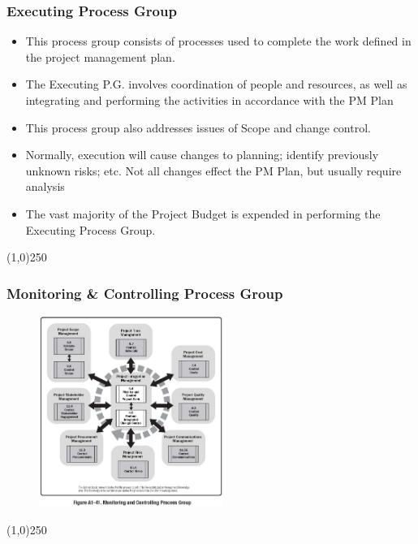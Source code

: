 \begin{frame}
\frametitle{Executing Process Group}
\begin{itemize}
	\item This process group consists of processes used to complete the work defined in the project management plan.
	\item The Executing P.G. involves coordination of people and resources, as well as integrating and performing the activities in accordance with the PM Plan
	\item This process group also addresses issues of Scope and change control.
	\item Normally, execution will cause changes to planning; identify previously unknown risks; etc.  Not all changes effect the PM Plan, but usually require analysis
	\item The vast majority of the Project Budget is expended in performing the Executing Process Group. 
\end{itemize}
\end{frame}
\begin{center}\line(1,0){250}\end{center}



\begin{frame}
\frametitle{Monitoring \& Controlling Process Group}
 \begin{figure}
 	\centering
 		\includegraphics[width = 6cm]{images/FigA1-41.jpg}
 	\label{fig:A1-41}
 \end{figure}
\end{frame}
\begin{center}\line(1,0){250}\end{center}



